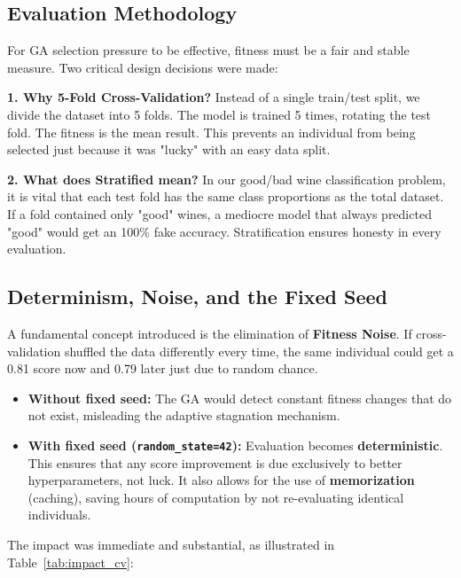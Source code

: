 \documentclass[12pt, a4paper]{article}
\begin{document}
\subsection{Evaluation Methodology}

For GA selection pressure to be effective, fitness must be a fair and stable measure.
Two critical design decisions were made:

\textbf{1. Why 5-Fold Cross-Validation?}
Instead of a single train/test split, we divide the dataset into 5 folds. The model is
trained 5 times, rotating the test fold. The fitness is the mean result. This prevents
an individual from being selected just because it was "lucky" with an easy data split.

\textbf{2. What does Stratified mean?}
In our good/bad wine classification problem, it is vital that each test fold has the
same class proportions as the total dataset. If a fold contained only "good" wines, a
mediocre model that always predicted "good" would get an 100\% fake accuracy.
Stratification ensures honesty in every evaluation.

\subsection{Determinism, Noise, and the Fixed Seed}

A fundamental concept introduced is the elimination of \textbf{Fitness Noise}. If
cross-validation shuffled the data differently every time, the same individual could
get a 0.81 score now and 0.79 later just due to random chance.
\begin{itemize}[itemsep=0.2em]
  \item \textbf{Without fixed seed:} The GA would detect constant fitness changes that
        do not exist, misleading the adaptive stagnation mechanism.
  \item \textbf{With fixed seed (\texttt{random\_state=42}):} Evaluation becomes
        \textbf{deterministic}. This ensures that any score improvement is due
        exclusively to better hyperparameters, not luck. It also allows for the use of
        \textbf{memorization} (caching), saving hours of computation by not re-evaluating
        identical individuals.
\end{itemize}

The impact was immediate and substantial, as illustrated in Table~\ref{tab:impact_cv}:
\end{document}
